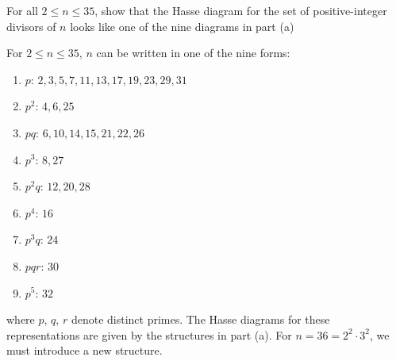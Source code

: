 \documentclass[a4paper, english, 12pt]{article} %
\begin{document}
\begin{problem}[16]
  \begin{subproblem}[2]
    For all $2 \leq n \leq 35$, show that the Hasse diagram for the set of
    positive-integer divisors of $n$ looks like one of the nine diagrams in part (a)
  \end{subproblem}
\end{problem}

\begin{answer}
  For $2 \leq n \leq 35$, $n$ can be written in one of the nine forms:
  \begin{enumerate}[label=($\roman*$)]
    \item $p$: $2, 3, 5, 7, 11, 13, 17, 19, 23, 29, 31$
    \item $p^2$: $4, 6, 25$
    \item $pq$: $6, 10, 14, 15, 21, 22, 26$
    \item $p^3$: $8, 27$
    \item $p^2q$: $12, 20, 28$
    \item $p^4$: $16$
    \item $p^3 q$: $24$
    \item $pqr$: $30$
    \item $p^5$: $32$
  \end{enumerate}
  where $p$, $q$, $r$ denote distinct primes. The Hasse diagrams for these
  representations are given by the structures in part (a). For $n = 36 = 2^2
  \cdot 3^2$, we must introduce a new structure.
\end{answer}

\newpageanswer
\end{document}
